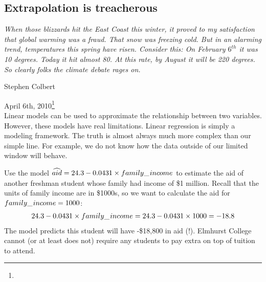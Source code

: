 \subsection{Extrapolation is treacherous}


{\em\small When those blizzards hit the East Coast this winter, it proved to my satisfaction that global warming was a fraud. That snow was freezing cold. But in an alarming trend, temperatures this spring have risen. Consider this: On February $6^{th}$ it was 10 degrees. Today it hit almost 80. At this rate, by August it will be 220 degrees. So clearly folks the climate debate rages on.\vspace{0.5mm}}

\noindent\hspace{\textwidth}\hspace{-40mm}Stephen Colbert

\noindent\hspace{\textwidth}\hspace{-40mm}April 6th, 2010\footnote{} \\

Linear models can be used to approximate the relationship between two variables. However, these models have real limitations. Linear regression is simply a modeling framework. The truth is almost always much more complex than our simple line. For example, we do not know how the data outside of our limited window will behave.

\textC{\pagebreak}

\begin{example}{Use the model $\widehat{aid} = 24.3 - 0.0431\times family\_\hspace{0.3mm}income$ to estimate the aid of another freshman student whose family had income of \$1 million.}
Recall that the units of family income are in \$1000s, so we want to calculate the aid for $family\_\hspace{0.3mm}income = 1000$:
\begin{align*}
24.3 - 0.0431\times family\_\hspace{0.3mm}income  = 24.3 - 0.0431\times 1000 = -18.8
\end{align*}
The model predicts this student will have -\$18,800 in aid (!). Elmhurst College cannot (or at least does not) require any students to pay extra on top of tuition to attend.
\end{example}

